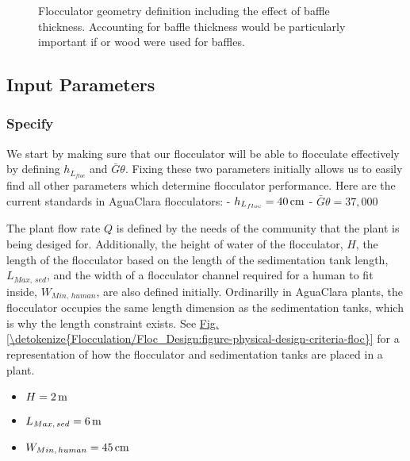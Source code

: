 \documentclass[letterpaper,10pt,english]{sphinxmanual}
\let\sphinxpxdimen\pdfpxdimen\else\newdimen\sphinxpxdimen
\begin{document}
\begin{figure}[htbp]
\centering
\capstart

\noindent\sphinxincludegraphics[width=600\sphinxpxdimen]{{Flocculator_physical_parameters}.jpg}
\caption{Flocculator geometry definition including the effect of baffle thickness. Accounting for baffle thickness would be particularly important if  or wood were used for baffles.}\label{\detokenize{Flocculation/Floc_Design:id16}}\label{\detokenize{Flocculation/Floc_Design:figure-floculator-physical-parameters}}\end{figure}


\subsection{Input Parameters}
\label{\detokenize{Flocculation/Floc_Design:input-parameters}}

\subsubsection{Specify}
\label{\detokenize{Flocculation/Floc_Design:specify}}
We start by making sure that our flocculator will be able to flocculate effectively by defining \(h_{L_{floc}}\) and \(\bar G \theta\). Fixing these two parameters initially allows us to easily find all other parameters which determine flocculator performance. Here are the current standards in AguaClara flocculators:
- \(h_{L_{floc}} = 40 \, {\rm cm}\)
- \(\bar G \theta = 37,000\)

The plant flow rate \(Q\) is defined by the needs of the community that the plant is being desiged for. Additionally, the height of water  of the flocculator, \(H\), the  length of the flocculator based on the length of the sedimentation tank length, \(L_{Max, \, sed}\), and the  width of a flocculator channel required for a human to fit inside, \(W_{Min, \, human}\), are also defined initially. Ordinarilly in AguaClara plants, the flocculator occupies the same length dimension as the sedimentation tanks, which is why the length constraint exists. See \hyperref[\detokenize{Flocculation/Floc_Design:figure-physical-design-criteria-floc}]{Fig.\@ \ref{\detokenize{Flocculation/Floc_Design:figure-physical-design-criteria-floc}}} for a representation of how the flocculator and sedimentation tanks are placed in a plant.
\begin{itemize}
\item {} 
\(H = 2 \, {\rm m}\)

\item {} 
\(L_{Max, \, sed} = 6 \, {\rm m}\)

\item {} 
\(W_{Min, \, human} = 45 \, {\rm cm}\)

\end{itemize}
\end{document}
